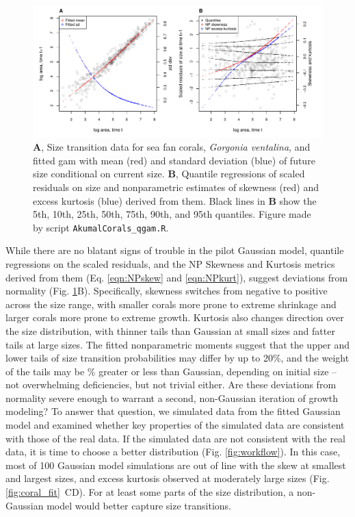 \documentclass[12pt]{article}
\begin{document}
\begin{spacing}{1.35}
	
	\begin{figure}[tbp]
		\centering
		\includegraphics[width=1.0\textwidth]{figures/coral_qgam_diagnostics.pdf}
		\caption{\textbf{A}, Size transition data for sea fan corals, \emph{Gorgonia ventalina}, and fitted gam with mean (red) and standard deviation (blue) of future size conditional on current size.  \textbf{B}, Quantile regressions of scaled residuals on size and nonparametric estimates of skewness (red) and excess kurtosis (blue) derived from them. Black lines in \textbf{B} show the 5th, 10th, 25th, 50th, 75th, 90th, and 95th quantiles. Figure made by script \texttt{AkumalCorals\_qgam.R}.}
		\label{fig:coral_diagnostics}
	\end{figure} 
	
	While there are no blatant signs of trouble in the pilot Gaussian model, quantile regressions on the scaled residuals, and the NP Skewness and Kurtosis metrics derived from them (Eq. \ref{eqn:NPskew} and \ref{eqn:NPkurt}), suggest deviations from normality (Fig. \ref{fig:coral_diagnostics}B).
	Specifically, skewness switches from negative to positive across the size range, with smaller corals more prone to extreme shrinkage and larger corals more prone to extreme growth.  
	Kurtosis also changes direction over the size distribution, with thinner tails than Gaussian at small sizes and fatter tails at large sizes. 
	The fitted nonparametric moments suggest that the upper and lower tails of size transition probabilities may differ by up to 20\%, and the weight of the tails may be \% greater or less than Gaussian, depending on initial size -- not overwhelming deficiencies, but not trivial either. 
	Are these deviations from normality severe enough to warrant a second, non-Gaussian iteration of growth modeling? 
	To answer that question, we simulated data from the fitted Gaussian model and examined whether key properties of the simulated data are consistent with those of the real data. 
	If the simulated data are not consistent with the real data, it is time to choose a better distribution (Fig. \ref{fig:workflow}). 
	In this case, most of 100 Gaussian model simulations are out of line with the skew at smallest and largest sizes, and excess kurtosis observed at moderately large sizes (Fig. \ref{fig:coral_fit}~CD). For at least some parts of the size distribution, a non-Gaussian model would better capture size transitions. 
	

\end{spacing}
\end{document}
